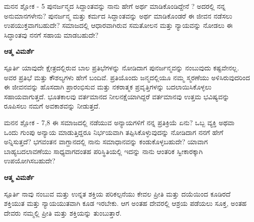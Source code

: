 \newpage
\begin{mananam}{\mananamfont ಮನನ ಶ್ಲೋಕ - \textenglish{5}}
\footnotesize \mananamtext ಪುನರ್ಜನ್ಮದ ಸಿದ್ದಾಂತವನ್ನು ನಾನು ಹೇಗೆ ಅರ್ಥ ಮಾಡಿಕೊಂಡಿದ್ದೇನೆ ? ಅದರಲ್ಲಿ ನನ್ನ ಅನುಮಾನಗಳೇನು?  ಪುನರ್ಜನ್ಮ ಮತ್ತು ಕರ್ಮದ ಸಿದ್ದಾಂತವನ್ನು ಅರ್ಥ ಮಾಡಿಕೊಂಡರೆ ಈ ಜೀವನ ನಡೆಸಲು ಉಪಯುಕ್ತವಾಗಬಹುದೇ? ಸಮಾಜದಲ್ಲಿ ಆಧಾರವಾಗಿರುವ ಸಮತೋಲನ ಮತ್ತು ನ್ಯಾಯವನ್ನು ನೋಡಲು ಈ ಸಿದ್ಧಾಂತವು ನನಗೆ ಸಹಾಯ ಮಾಡಬಹುದೇ?
\end{mananam}
\WritingHand\enspace\textbf{ಆತ್ಮ ವಿಮರ್ಶೆ}\\
\begin{inspiration}{\mananamfont ಸ್ಪೂರ್ತಿ}
\footnotesize \mananamtext ಯಾವುದೇ ಕ್ಷೇತ್ರದಲ್ಲಿರುವ ಬಾಲ ಪ್ರತಿಭೆಗಳನ್ನು ನೋಡಿದಾಗ ಪುನರ್ಜನ್ಮವನ್ನು ನಂಬುವುದು ಕಷ್ಟವೇನಲ್ಲ. ಅವರ ಪ್ರತಿಭೆ ಮತ್ತು ಕೌಶಲ್ಯಗಳು ಹೇಗೆ ಬಂದಿವೆ. ಪ್ರತಿಯೊಂದು ಜನ್ಮದಲ್ಲಿಯೂ ನಮ್ಮ ಸ್ಮರಣೆಯು ಅಳಿಸಿರುವುದರಿಂದ ಈ ಜೀವನವನ್ನು ಹೊಸದಾಗಿ ಪ್ರಾರಂಭಿಸುವ ಮತ್ತು ನಕರಾತ್ಮಕ ಪ್ರವೃತ್ತಿಗಳನ್ನು ಬದಲಾಯಿಸಿಕೊಳ್ಳಲು ಸಹಾಯವಾಗುತ್ತದೆ. ಭೂತಕಾಲವು ವರ್ತಮಾನದ ನೀಲನಕ್ಷೆಯಾಗಿದ್ದರೆ ವರ್ತಮಾನವು ಉತ್ತಮ ಭವಿಷ್ಯವನ್ನು ರೂಪಿಸಲು ನಮಗೆ ಅವಕಾಶವನ್ನು ನೀಡುತ್ತದೆ.\\
\end{inspiration}
\newpage


\newpage
\begin{mananam}{\mananamfont ಮನನ ಶ್ಲೋಕ - \textenglish{7,8}}
\footnotesize \mananamtext ಈ ಸಮಾಜದಲ್ಲಿ ನಡೆಯುವ ಅನ್ಯಾಯಗಳಿಗೆ ನನ್ನ ಪ್ರತಿಕ್ರಿಯೆ ಏನು? ಒಬ್ಬ ವ್ಯಕ್ತಿ ಅಥವಾ ಒಂದು ಗುಂಪು ಅನ್ಯಾಯ ಮಾಡುತ್ತಿದ್ದರೂ ನಿರ್ಭಯವಾಗಿ ತಪ್ಪಿಸಿಕೊಳ್ಳುವುದನ್ನು ನೋಡಿದಾಗ ನನಗೆ ಹೇಗೆ ಅನ್ನಿಸುತ್ತದೆ? ಭಗವಂತನ  ವಾಗ್ದಾನದಲ್ಲಿ ನಾನು ಸಮಾಧಾನವನ್ನು ಕಂಡುಕೊಳ್ಳಬಹುದೇ? ಯಾವಾಗ ಬಾಹ್ಯಬದಲಾವಣೆಯು ಸಾಧ್ಯವಾಗದಂತಹ ಪರಿಸ್ಥಿತಿಯಲ್ಲಿ ಇದನ್ನು ನಾನು ಆಂತರಿಕ ಸ್ವೀಕಾರಕ್ಕಾಗಿ ಉಪಯೋಗಿಸಬಹುದೇ?
\end{mananam}
\WritingHand\enspace\textbf{ಆತ್ಮ ವಿಮರ್ಶೆ}\\
\begin{inspiration}{\mananamfont ಸ್ಪೂರ್ತಿ}
\footnotesize \mananamtext ನಾವು ನಂಬುವ ಮತ್ತು ಉನ್ನತ ಶಕ್ತಿಯ ಪರಿಕಲ್ಪನೆಯು ಕೇವಲ ಪ್ರೀತಿ ಮತ್ತು ದಯೆಯಿಂದ ಕೂಡಿರದೆ ಶಕ್ತಿಯುತ ಮತ್ತು ನ್ಯಾಯಯುತವಾಗಿ ಕೂಡ ಇರಬೇಕು. ಆಗ ಅಂತಹ ದೇವರಲ್ಲಿ ಆಶ್ರಯ ಪಡೆಯಲು  ಸೂಕ್ತ, ಅಂತಹ ದೇವರು ನಮ್ಮಲ್ಲಿ ಪ್ರೀತಿ ಮತ್ತು ಶಕ್ತಿಯನ್ನು ತುಂಬುತ್ತಾರೆ.
\end{inspiration}
\newpage

